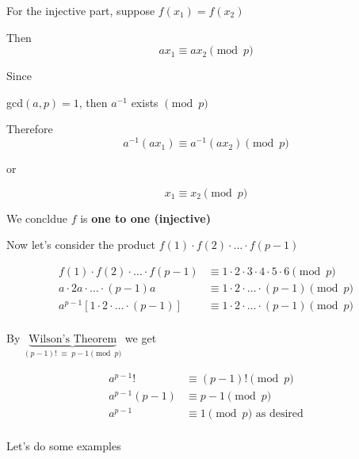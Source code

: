 \documentclass[../../Main.tex]{subfiles}
\begin{document}
\begin{theorem}
\begin{poof}
\begin{example}
            For the injective part, suppose $f(x_1) = f(x_2)$

            Then $$ax_1 \equiv ax_2 \pmod{p}$$

            Since 
            \begin{center}
                gcd$(a, p) = 1$, then $a^{-1}$ exists $\pmod{p}$
            \end{center}

            Therefore $$a^{-1}(ax_1) \equiv a^{-1}(ax_2) \pmod{p}$$

            or

            $$x_1 \equiv x_2 \pmod{p}$$

            We concldue $f$ is \textbf{one to one (injective)}

            Now let's consider the product $f(1) \cdot f(2) \cdot \ldots \cdot f(p - 1)$

            \begin{align*}
                f(1) \cdot f(2) \cdot \ldots \cdot f(p - 1) &\equiv 1 \cdot 2 \cdot 3 \cdot 4 \cdot 5 \cdot 6 \pmod{p} \\
                a \cdot 2a \cdot \ldots \cdot (p - 1)a &\equiv 1 \cdot 2 \cdot \ldots \cdot (p - 1) \pmod{p} \\
                a^{p - 1} \left[1 \cdot 2 \cdot \ldots \cdot (p - 1) \right] &\equiv 1 \cdot 2 \cdot \ldots \cdot (p - 1) \pmod{p} \\
            \end{align*}

            By $\underbrace{\text{Wilson's Theorem}}_{(p - 1)! \; \equiv \; p - 1 \pmod{p}}$ we get

            \begin{align*}
                a^{p - 1}! &\equiv (p - 1)! \pmod{p} \\
                a^{p - 1}(p - 1) &\equiv p - 1 \pmod{p} \\
                a^{p - 1} &\equiv 1 \pmod{p} \text{ as desired} \\
            \end{align*}

        \end{example}
    \end{poof}

\end{theorem}

Let's do some examples
\end{document}
